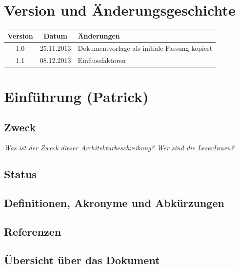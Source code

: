 \documentclass[fontsize=12pt,paper=a4,twoside]{scrartcl}
\begin{document}
\listoftables

\clearpage

\section*{Version und Änderungsgeschichte}

\begin{tabular}{ccl}
Version & Datum & Änderungen \\
\hline
1.0 & 25.11.2013 & Dokumentvorlage als initiale Fassung kopiert \\
1.1 & 08.12.2013 & Einflussfaktoren \\
\end{tabular}


\section{Einführung (Patrick)}

\subsection{Zweck}

  {\em Was ist der Zweck dieser Architekturbeschreibung? Wer sind
  die LeserInnen?}

\subsection{Status}


  
\subsection{Definitionen, Akronyme und Abkürzungen}


\subsection{Referenzen}

\subsection{Übersicht über das Dokument}
\end{document}
